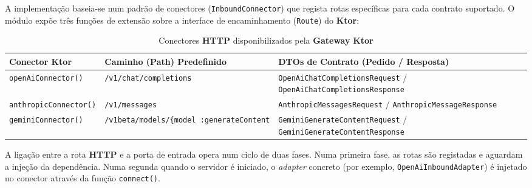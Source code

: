     A implementação baseia-se num padrão de conectores (\texttt{InboundConnector}) que regista rotas específicas para cada contrato suportado. O módulo expõe três funções de extensão sobre a interface de encaminhamento (\texttt{Route}) do \textbf{Ktor}:

    \begin{table}[H]
        \centering
        \footnotesize
        \renewcommand{\arraystretch}{1.25}
        \begin{tabularx}{\textwidth}{|>{\raggedright\arraybackslash}p{3.5cm}|>{\raggedright\arraybackslash}p{4cm}|Y|}
            \hline
            \textbf{Conector Ktor} & \textbf{Caminho (Path) Predefinido} & \textbf{DTOs de Contrato (Pedido / Resposta)} \\
            \hline
            \texttt{openAiConnector()} & \texttt{/v1/chat/completions} & \texttt{OpenAiChatCompletionsRequest} / \texttt{OpenAiChatCompletionsResponse} \\
            \hline
            \texttt{anthropicConnector()} & \texttt{/v1/messages} & \texttt{AnthropicMessagesRequest} / \texttt{AnthropicMessageResponse} \\
            \hline
            \texttt{geminiConnector()} & \texttt{/v1beta/models/\{model\
            :generateContent} & \texttt{GeminiGenerateContentRequest} / \texttt{GeminiGenerateContentResponse} \\
            \hline
        \end{tabularx}
        \caption{Conectores \textbf{HTTP} disponibilizados pela \textbf{Gateway} \textbf{Ktor}}
        \label{tab:ktor-connectors}
    \end{table}

    A ligação entre a rota \textbf{HTTP} e a porta de entrada opera num ciclo de duas fases. Numa primeira fase, as rotas são registadas e aguardam a injeção da dependência. Numa segunda quando o servidor é iniciado, o \textit{adapter} concreto (por exemplo, \texttt{OpenAiInboundAdapter}) é injetado no conector através da função \texttt{connect()}.
    
